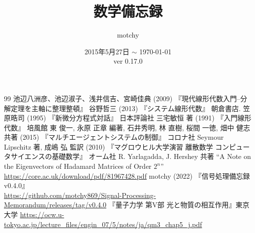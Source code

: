 \documentclass[dvipdfmx,uplatex,report]{jsbook}%
\theoremstyle{definition}%
\def\docVerMajor{0}
\def\docVerMinor{17}
\def\docVerPatch{0}
\def\docVerWip{} %
\def\docVer{\docVerMajor.\docVerMinor.\docVerPatch\docVerWip}
\begin{document}
	\title{数学備忘録}
	\author{motchy}
	\date{ 2015年5月27日 $\sim$ \today \\ver \docVer}
	\maketitle
	{\scriptsize \tableofcontents}
	
	
	
	
	
	
	
	
	
	\begin{thebibliography}{99}
		 池辺八洲彦、池辺淑子、浅井信吉、宮崎佳典 (2009) 『現代線形代数入門--分解定理を主軸に整理整頓』
		 谷野哲三 (2013) 『システム線形代数』 朝倉書店.
		 笠原晧司 (1995) 『新微分方程式対話』 日本評論社
		 三宅敏恒 著 (1991) 『入門線形代数』 培風館
		 東 俊一, 永原 正章 編著, 石井秀明, 林 直樹, 桜間 一徳, 畑中 健志 共著 (2015) 『マルチエージェントシステムの制御』 コロナ社
		Seymour Lipschitz 著, 成嶋 弘 監訳 (2010) 『マグロウヒル大学演習 離散数学 コンピュータサイエンスの基礎数学』 オーム社
		 R. Yarlagadda, J. Hershey 共著 ``A Note on the Eigenvectors of Hadamard Matrices of Order $2^n$'' \url{https://core.ac.uk/download/pdf/81967428.pdf}
		 motchy (2022) 『信号処理備忘録 v0.4.0』\\ \url{https://github.com/motchy869/Signal-Processing-Memorandum/releases/tag/v0.4.0}
		 『量子力学 第V部 光と物質の相互作用』東京大学 \url{https://ocw.u-tokyo.ac.jp/lecture_files/engin_07/5/notes/ja/qm3_chap5_j.pdf}
	\end{thebibliography}
\end{document}
